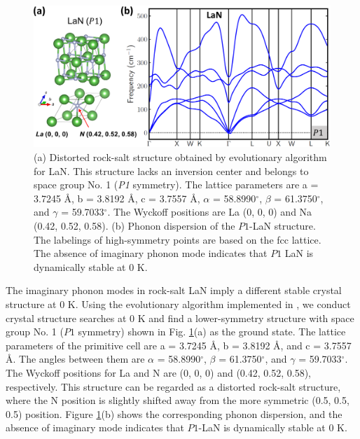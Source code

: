 	\begin{figure}
	\centering
    \captionsetup{singlelinecheck = false, justification=justified}
	\includegraphics[width=0.8\linewidth]{LaN_2.png}
	\caption [Newly found LaN in distorted rock-salt structure and its phonon dispersion.]{(a) Distorted rock-salt structure obtained by evolutionary algorithm for LaN. This structure lacks an inversion center and belongs to space group No. 1 (\textit{P1} symmetry). The lattice parameters are a = 3.7245 \r{A}, b = 3.8192 \r{A}, c = 3.7557 \r{A}, $\alpha$ = 58.8990$^{\circ}$, $\beta$ = 61.3750$^{\circ}$, and $\gamma$ = 59.7033$^{\circ}$. The Wyckoff positions are La (0, 0, 0) and Na (0.42, 0.52, 0.58). (b) Phonon dispersion of the $P1$-LaN structure. The labelings of high-symmetry points are based on the fcc lattice. The absence of imaginary phonon mode indicates that $P1$ LaN is dynamically stable at 0 K.}
	\label{fig:LaN_2}
	\end{figure}
	
	The imaginary phonon modes in rock-salt LaN imply a different stable crystal structure at 0 K. Using the evolutionary algorithm implemented in  \cite{oganov2006crystal, glass2006uspex, lyakhov2013new}, we conduct crystal structure searches at 0 K and find a lower-symmetry structure with space group No. 1 ($P1$ symmetry) shown in Fig. \ref{fig:LaN_2}(a) as the ground state. The lattice parameters of the primitive cell are a = 3.7245 \r{A}, b = 3.8192 \r{A}, and c = 3.7557 \r{A}. The angles between them are $\alpha$ = 58.8990$^{\circ}$, $\beta$ = 61.3750$^{\circ}$, and $\gamma$ =   59.7033$^{\circ}$. The Wyckoff positions for La and N are (0, 0, 0) and (0.42, 0.52, 0.58), respectively. This structure can be regarded as a distorted rock-salt structure, where the N position is slightly shifted away from the more symmetric (0.5, 0.5, 0.5) position. Figure \ref{fig:LaN_2}(b) shows the corresponding phonon dispersion, and the absence of imaginary mode indicates that $P1$-LaN is dynamically stable at 0 K.


